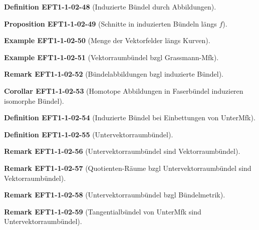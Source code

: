 \documentclass[10pt, letterpaper]{article}
\newcommand{\CustomHeading}[3]{%
  \par\medskip\noindent%
  \textbf{#1 #2} \textnormal{(#3)}.\enskip%
}
\newenvironment{DEF}[2]{\CustomHeading{Definition}{#1}{#2}}{}
\newenvironment{PROP}[2]{\CustomHeading{Proposition}{#1}{#2}}{}
\newenvironment{KORO}[2]{\CustomHeading{Corollar}{#1}{#2}}{}
\newenvironment{REM}[2]{\CustomHeading{Remark}{#1}{#2}}{}
\newenvironment{EXA}[2]{\CustomHeading{Example}{#1}{#2}}{}
\begin{document}
\begin{DEF}{EFT1-1-02-48}{Induzierte Bündel durch Abbildungen}
\end{DEF}

\begin{PROP}{EFT1-1-02-49}{Schnitte in induzierten Bündeln längs $f$}
\end{PROP}

\begin{EXA}{EFT1-1-02-50}{Menge der Vektorfelder längs Kurven}
\end{EXA}

\begin{EXA}{EFT1-1-02-51}{Vektorraumbündel bzgl Grassmann-Mfk}
\end{EXA}

\begin{REM}{EFT1-1-02-52}{Bündelabbildungen bzgl induzierte Bündel}
\end{REM}

\begin{KORO}{EFT1-1-02-53}{Homotope Abbildungen in Faserbündel induzieren isomorphe Bündel}
\end{KORO}

\begin{DEF}{EFT1-1-02-54}{Induzierte Bündel bei Einbettungen von UnterMfk}
\end{DEF}

\begin{DEF}{EFT1-1-02-55}{Untervektorraumbündel}
\end{DEF}

\begin{REM}{EFT1-1-02-56}{Untervektorraumbündel sind Vektorraumbündel}
\end{REM}

\begin{REM}{EFT1-1-02-57}{Quotienten-Räume bzgl Untervektorraumbündel sind Vektorraumbündel}
\end{REM}

\begin{REM}{EFT1-1-02-58}{Untervektorraumbündel bzgl Bündelmetrik}
\end{REM}

\begin{REM}{EFT1-1-02-59}{Tangentialbündel von UnterMfk sind Untervektorraumbündel}
\end{REM}
\end{document}
